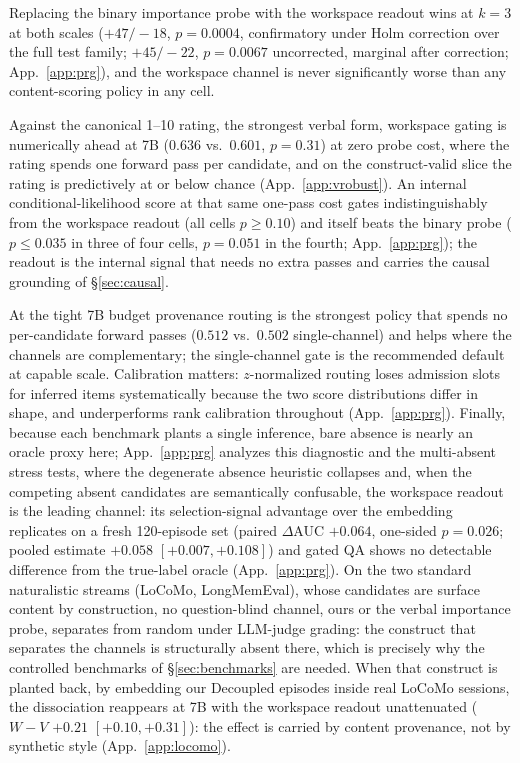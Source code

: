 Replacing the
binary importance probe with the workspace readout wins at $k{=}3$ at both
scales ($+47/-18$, $p{=}0.0004$, confirmatory under Holm correction over the
full test family; $+45/-22$, $p{=}0.0067$ uncorrected, marginal after
correction; App.~\ref{app:prg}),
and the workspace channel is never significantly worse than any
content-scoring policy in any cell.

Against the canonical 1--10
rating, the strongest verbal form, workspace gating is numerically ahead at
7B ($0.636$ vs.\ $0.601$, $p{=}0.31$) at zero probe cost, where the rating
spends one forward pass per candidate, and on the construct-valid slice the
rating is predictively at or below chance (App.~\ref{app:vrobust}). An
internal conditional-likelihood score at that same one-pass cost gates
indistinguishably from the workspace readout (all cells $p{\ge}0.10$) and
itself beats the binary probe ($p{\le}0.035$ in three of four cells,
$p{=}0.051$ in the fourth; App.~\ref{app:prg}); the readout is the internal
signal that needs no extra passes and carries the causal grounding of
\S\ref{sec:causal}.

At the tight 7B budget provenance routing is the strongest policy
that spends no per-candidate forward passes ($0.512$ vs.\ $0.502$
single-channel) and helps where the channels are complementary; the single-channel
gate is the recommended default at capable scale. Calibration matters:
$z$-normalized routing loses admission slots for inferred items
systematically because the two score distributions differ in shape, and
underperforms rank calibration throughout (App.~\ref{app:prg}). Finally,
because each benchmark plants a single inference, bare absence is nearly an
oracle proxy here; App.~\ref{app:prg} analyzes this diagnostic and the
multi-absent stress tests, where the degenerate absence heuristic collapses
and, when the competing absent candidates are semantically confusable, the
workspace readout is the leading channel: its selection-signal advantage
over the embedding replicates on a fresh 120-episode set (paired
$\Delta$AUC $+0.064$, one-sided $p{=}0.026$; pooled estimate $+0.058$
$[+0.007, +0.108]$) and gated QA shows no
detectable difference from the true-label oracle (App.~\ref{app:prg}).
On the two standard naturalistic streams (LoCoMo, LongMemEval), whose
candidates are surface content by construction, no question-blind channel,
ours or the verbal importance probe, separates from random under LLM-judge
grading:
the construct that separates the channels is structurally absent there, which
is precisely why the controlled benchmarks of \S\ref{sec:benchmarks} are
needed. When that construct is planted back, by embedding our Decoupled
episodes inside real LoCoMo sessions, the dissociation reappears at 7B with
the workspace readout unattenuated ($W{-}V$ $+0.21$ $[+0.10, +0.31]$): the
effect is carried by content provenance, not by synthetic style
(App.~\ref{app:locomo}).
